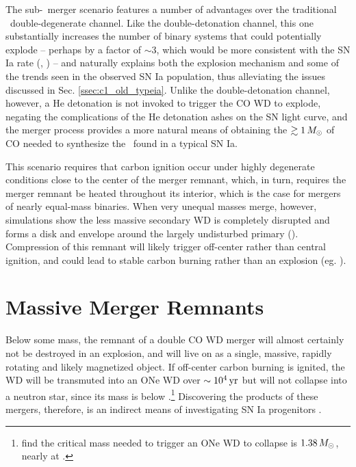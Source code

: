 The sub-\Mch\ merger scenario features a number of advantages over the traditional \Mch\ double-degenerate channel.  Like the double-detonation channel, this one substantially increases the number of binary systems that could potentially explode -- perhaps by a factor of $\sim3$, which would be more consistent with the SN Ia rate (\citeal{vkercj10}, \citealt{badem12}) -- and naturally explains both the explosion mechanism and some of the trends seen in the observed SN Ia population, thus alleviating the issues discussed in Sec. \ref{ssec:c1_old_typeia}.  Unlike the double-detonation channel, however, a He detonation is not invoked to trigger the CO WD to explode, negating the complications of the He detonation ashes on the SN light curve, and the merger process provides a more natural means of obtaining the $\gtrsim1\,\Msun$ of CO needed to synthesize the \Ni\ found in a typical SN Ia.

This scenario requires that carbon ignition occur under highly degenerate conditions close to the center of the merger remnant, which, in turn, requires the merger remnant be heated throughout its interior, which is the case for mergers of nearly equal-mass binaries.  When very unequal masses merge, however, simulations show the less massive secondary WD is completely disrupted and forms a disk and envelope around the largely undisturbed primary (\citeal{loreig09}).  Compression of this remnant will likely trigger off-center rather than central ignition, and could lead to stable carbon burning rather than an explosion (eg. \citealt{yoonpr07, shen+12}).

\section{Massive Merger Remnants}
\label{sec:c1_hotdqs}

Below some mass, the remnant of a double CO WD merger will almost certainly not be destroyed in an explosion, and will live on as a single, massive, rapidly rotating and likely magnetized object.  If off-center carbon burning is ignited, the WD will be transmuted into an ONe WD over $\sim10^4\,\mathrm{yr}$ \citep{nomoi85, shen+12, schw+16} but will not collapse into a neutron star, since its mass is below \Mch.\footnote{\cite{schwqb15} find the critical mass needed to trigger an ONe WD to collapse is $1.38\,\Msun$, nearly at \Mch.}  Discovering the products of these mergers, therefore, is an indirect means of investigating SN Ia progenitors \citep{dunlc15}.

